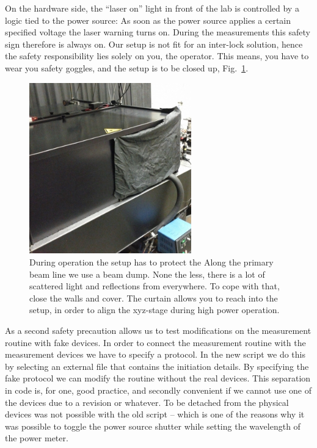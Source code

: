 On the hardware side,
the ``laser on'' light in front of the lab
is controlled by a logic tied to the power source:
As soon as the power source applies a certain specified voltage
the laser warning turns on.
During the measurements this safety sign therefore
is always on.
Our setup is not fit for an inter-lock solution,
hence the safety responsibility lies solely on you,
the operator.
This means,
you have to wear you safety goggles,
and the setup is to be closed up,
Fig.~\ref{img:setup_enclosure}.

\begin{figure}
\centering
\includegraphics[width=7cm]{img/setup_enclosure.jpg}
\caption{During operation the setup
has to protect the 
Along the primary beam line we use a beam dump.
None the less, there is a lot of scattered light
and reflections from everywhere.
To cope with that,
close the walls and cover.
The curtain allows you to reach into the setup,
in order to align the xyz-stage
during high power operation.}
\label{img:setup_enclosure}
\end{figure}

As a second safety precaution
 allows us to test 
modifications on the measurement routine with fake devices.
In order to connect the measurement routine with the measurement devices
we have to specify a protocol.
In the new script we do this by selecting an external file
that contains the initiation details.
By specifying the fake protocol we can modify the routine without the real devices.
This separation in code is, for one, good practice,
and secondly convenient if we cannot use one of the devices due to a revision or whatever.
To be detached from the physical devices was not possible with the old script --
which is one of the reasons why it was possible to toggle the power source shutter
while setting the wavelength of the power meter.

